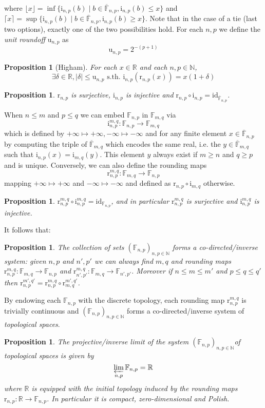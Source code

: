 \documentclass[10pt,a4paper]{article}
\theoremstyle{plain}
\newtheorem{proposition}[theorem]{Proposition}
\theoremstyle{definition}
\newcommand{\F}[1][n,p]{\mathbb{F}_{#1}}
\newcommand{\Ff}[1][n,p]{\overline{\mathbb{F}}_{#1}}
\newcommand{\N}{\mathbb{N}}
\newcommand{\R}{\mathbb{R}}
\newcommand{\Rep}[1][n,p]{\mathrm{i}_{#1}}
\newcommand{\Round}[1][n,p]{\mathrm{r}_{#1}}
\newcommand{\id}{\mathrm{id}}
\newcommand{\uro}[1][n,p]{\mathrm{u}_{#1}}
\newcommand{\absv}[1]{\vert #1\vert}
\newcommand{\ceil}[1]{\lceil #1 \rceil}
\newcommand{\floor}[1]{\lfloor #1 \rfloor}
\begin{document}
where $\floor{x}=\inf \{\Rep(b)\mid b\in \Ff, \Rep(b)\leq x \}$ and $\ceil{x}=\sup \{\Rep(b)\mid b\in \Ff, \Rep(b)\geq x\}$. Note that in the case of a tie (last two options), exactly one of the two possibilities hold. For each $n,p$ we define the \emph{unit roundoff} $\uro$ as
\[
\uro=2^{-(p+1)}
\]
\begin{proposition}[Higham]\label{prop:roundoff}
For each $x\in \R$ and each $n,p\in\N$, 
\[
\exists\delta\in\R, \absv{\delta}\leq \uro\text{ s.th. } \Rep(\Round(x))=x(1+\delta)
\]
\end{proposition}

\begin{proposition}
$\Round$ is surjective, $\Rep$ is injective and $\Round\circ\Rep=\id_{\Ff}$.
\end{proposition}

\noindent When $n\leq m$ and $p\leq q$ we can embed $\F$ in $\F[m,q]$ via 
\[
\Rep^{m,q}:\F\to \F[m,q]
\]
which is defined by $+\infty  \mapsto +\infty,-\infty \mapsto -\infty$
and for any finite element $x\in \Ff$ by computing the triple of $\Ff[m,q]$ which encodes the same real, i.e. the $y\in\Ff[m,q]$ such that $\Rep(x)=\Rep[m,q](y)$. This element $y$ always exist if $m\geq n$ and $q\geq p$ and is unique. Conversely, we can also define the rounding maps
\[
\Round^{m,q}: \F[m,q]\to \F
\]
mapping $+\infty\mapsto+\infty$ and $-\infty\mapsto-\infty$ and defined as $\Round\circ \Rep[m,q]$ otherwise. 

\begin{proposition}
$\Round^{m,q}\circ \Rep^{m,q}=\id_{\F}$, and in particular $\Round^{m,q}$ is surjective and $\Rep^{m,q}$ is injective.
\end{proposition}
It follows that: 
\begin{proposition}
The collection of sets $(\F)_{n,p\in\N}$ forms a co-directed/inverse system: given $n,p$ and $n',p'$ we can always find $m,q$ and rounding maps $\Round^{m,q}: \F[m,q]\to \F$ and $\Round[n',p']^{m,q}: \F[m,q]\to\F[n',p']$. Moreover if $n\leq m\leq m'$ and $p\leq q\leq q'$ then $\Round^{m',q'}=\Round^{m,q}\circ \Round[m,q]^{m',q'}$.
\end{proposition}

By endowing each $\F$ with the discrete topology, each rounding map $\Round^{m,q}$ is trivially continuous and $(\F)_{n,p\in\N}$ forms a co-directed/inverse system of \emph{topological spaces}. 

\begin{proposition}\label{prop:projlim}
The projective/inverse limit of the system $(\F)_{n,p\in\N}$of topological spaces is given by 
\[
\varprojlim_{n,p}\F =\R
\]
where $\R$ is equipped with the initial topology induced by the rounding maps $\Round: \R\to\F$. In particular it is compact, zero-dimensional and Polish.
\end{proposition}
\end{document}
